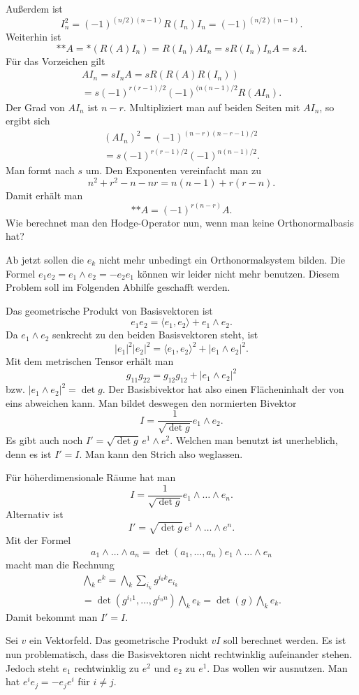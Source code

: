 \documentclass[a4paper,10pt,fleqn,twocolumn,twoside]{article}
\begin{document}
Außerdem ist
\[I_n^2 = (-1)^{(n/2)(n-1)} R(I_n)I_n = (-1)^{(n/2)(n-1)}.\]
Weiterhin ist
\[*{*A} = *(R(A)I_n) = R(I_n)AI_n = sR(I_n)I_nA = sA.
\]
Für das Vorzeichen gilt
\begin{gather*}
AI_n = sI_nA = sR(R(A)R(I_n))\\
= s(-1)^{r(r-1)/2}(-1)^{(n(n-1)/2} R(AI_n).
\end{gather*}
Der Grad von $AI_n$ ist $n-r$.
Multipliziert man auf beiden Seiten mit $AI_n$, so ergibt sich
\begin{gather*}
(AI_n)^2 = (-1)^{(n-r)(n-r-1)/2}\\
= s(-1)^{r(r-1)/2}(-1)^{n(n-1)/2}.
\end{gather*}
Man formt nach $s$ um. Den Exponenten vereinfacht man zu
\[n^2+r^2-n-nr = n(n-1) + r(r-n).\]
Damit erhält man
\[*{*A} = (-1)^{r(n-r)}A.\]
Wie berechnet man den Hodge-Operator nun, wenn man keine
Orthonormalbasis hat?

Ab jetzt sollen die $e_k$ nicht mehr unbedingt ein Orthonormalsystem
bilden. Die Formel $e_1e_2=e_1\wedge e_2=-e_2e_1$ können wir leider
nicht mehr benutzen. Diesem Problem soll im Folgenden Abhilfe
geschafft werden.

Das geometrische Produkt von Basisvektoren ist
\[e_1e_2 = \langle e_1,e_2\rangle + e_1\wedge e_2.\]
Da $e_1\wedge e_2$ senkrecht zu den beiden Basisvektoren steht, ist
\[|e_1|^2|e_2|^2 = \langle e_1,e_2\rangle^2+|e_1\wedge e_2|^2.\]
Mit dem metrischen Tensor erhält man
\[g_{11} g_{22} = g_{12} g_{12} + |e_1\wedge e_2|^2\]
bzw. $|e_1\wedge e_2|^2 = \det g.$
Der Basisbivektor hat also einen Flächeninhalt der von eins abweichen
kann. Man bildet deswegen den normierten Bivektor
\[I = \frac{1}{\sqrt{\det g}}e_1\wedge e_2.\]
Es gibt auch noch $I'=\sqrt{\det g}\,e^1\wedge e^2$. Welchen man
benutzt ist unerheblich, denn es ist $I'=I$. Man kann den Strich
also weglassen.

Für höherdimensionale Räume hat man
\[I = \frac{1}{\sqrt{\det g}}e_1\wedge\ldots\wedge e_n.\]
Alternativ ist
\[I' = \sqrt{\det g}\,e^1\wedge\ldots\wedge e^n.\]
Mit der Formel
\[a_1\wedge\ldots\wedge a_n
= \det(a_1,\ldots,a_n)e_1\wedge\ldots\wedge e_n\]
macht man die Rechnung
\begin{gather*}
\bigwedge_k e^k
= \bigwedge_k \sum_{i_k} g^{{i_k}k} e_{i_k}\\
= \det(g^{{i_1}1},\ldots,g^{{i_n}n})\bigwedge_k e_k
= \det(g)\bigwedge_k e_k.
\end{gather*}
Damit bekommt man $I'=I$.

Sei $v$ ein Vektorfeld. Das geometrische Produkt $vI$
soll berechnet werden. Es ist nun problematisch, dass die
Basisvektoren nicht rechtwinklig aufeinander stehen. Jedoch
steht $e_1$ rechtwinklig zu $e^2$ und $e_2$ zu $e^1$.
Das wollen wir ausnutzen. Man hat $e^ie_j=-e_je^i$ für $i\ne j$.
\end{document}

